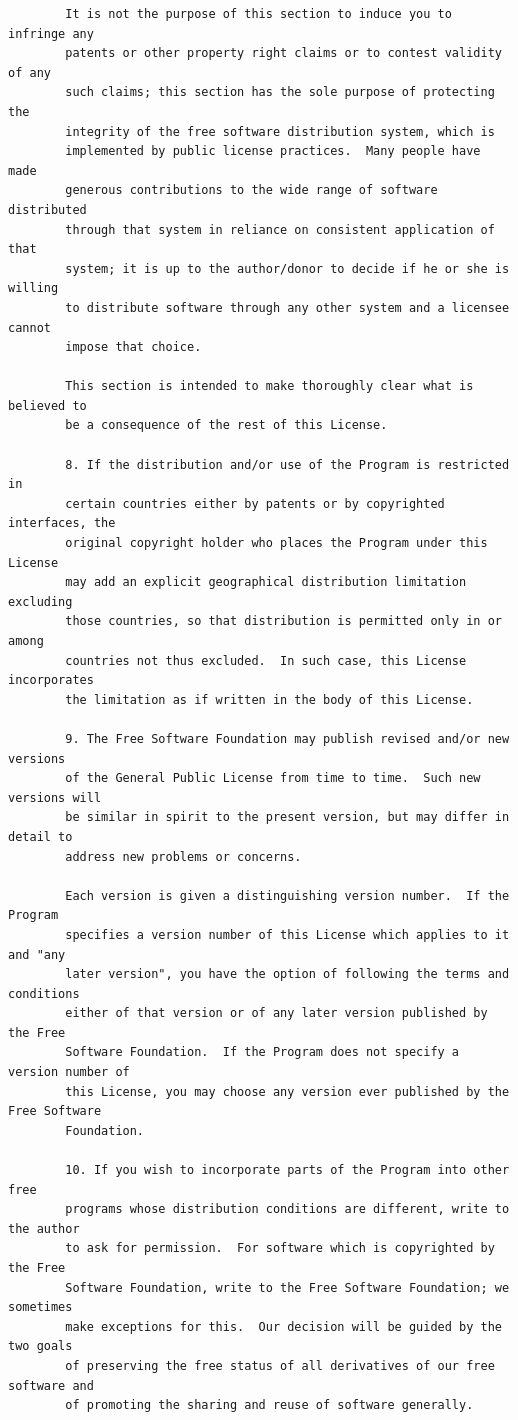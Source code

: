\documentclass[a4paper,twoside,12pt]{book}
\begin{document}
{\begin{verbatim}
		It is not the purpose of this section to induce you to infringe any
		patents or other property right claims or to contest validity of any
		such claims; this section has the sole purpose of protecting the
		integrity of the free software distribution system, which is
		implemented by public license practices.  Many people have made
		generous contributions to the wide range of software distributed
		through that system in reliance on consistent application of that
		system; it is up to the author/donor to decide if he or she is willing
		to distribute software through any other system and a licensee cannot
		impose that choice.

		This section is intended to make thoroughly clear what is believed to
		be a consequence of the rest of this License.

		8. If the distribution and/or use of the Program is restricted in
		certain countries either by patents or by copyrighted interfaces, the
		original copyright holder who places the Program under this License
		may add an explicit geographical distribution limitation excluding
		those countries, so that distribution is permitted only in or among
		countries not thus excluded.  In such case, this License incorporates
		the limitation as if written in the body of this License.

		9. The Free Software Foundation may publish revised and/or new versions
		of the General Public License from time to time.  Such new versions will
		be similar in spirit to the present version, but may differ in detail to
		address new problems or concerns.

		Each version is given a distinguishing version number.  If the Program
		specifies a version number of this License which applies to it and "any
		later version", you have the option of following the terms and conditions
		either of that version or of any later version published by the Free
		Software Foundation.  If the Program does not specify a version number of
		this License, you may choose any version ever published by the Free Software
		Foundation.

		10. If you wish to incorporate parts of the Program into other free
		programs whose distribution conditions are different, write to the author
		to ask for permission.  For software which is copyrighted by the Free
		Software Foundation, write to the Free Software Foundation; we sometimes
		make exceptions for this.  Our decision will be guided by the two goals
		of preserving the free status of all derivatives of our free software and
		of promoting the sharing and reuse of software generally.


\end{verbatim}}
\end{document}

